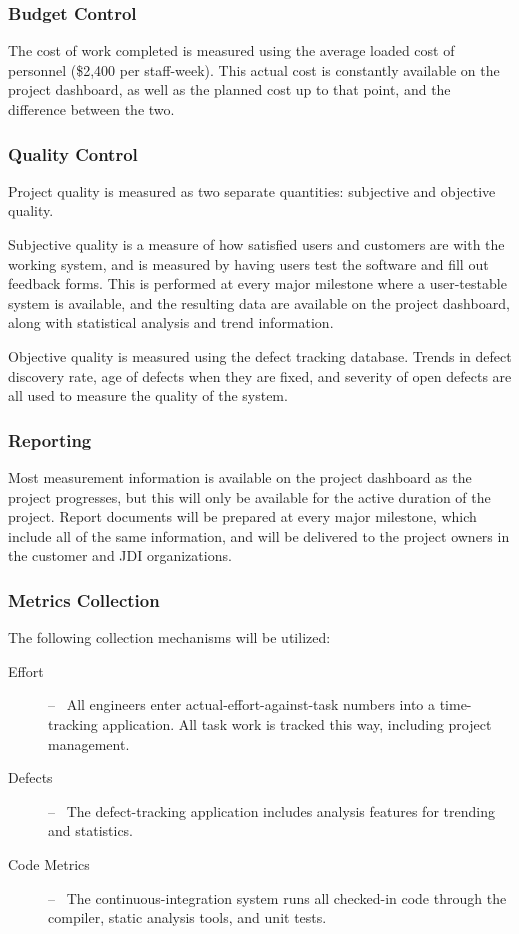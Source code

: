 \documentclass[11pt]{article}
\newcommand{\loadedcost}{\$2,400 per staff-week}
\begin{document}
\subsubsection{Budget Control}
The cost of work completed is measured using the average loaded cost of personnel (\loadedcost).
This actual cost is constantly available on the project dashboard, as well as the planned cost up to
that point, and the difference between the two.  


\subsubsection{Quality Control}
Project quality is measured as two separate quantities: subjective and objective quality.

Subjective quality is a measure of how satisfied users and customers are with the working system,
and is measured by having users test the software and fill out feedback forms.  This is performed at
every major milestone where a user-testable system is available, and the resulting data are
available on the project dashboard, along with statistical analysis and trend information.

Objective quality is measured using the defect tracking database.  Trends in defect discovery rate,
age of defects when they are fixed, and severity of open defects are all used to measure the quality
of the system.
  
\subsubsection{Reporting}
Most measurement information is available on the project dashboard as the project progresses, but
this will only be available for the active duration of the project.  Report documents will be
prepared at every major milestone, which include all of the same information, and will be delivered
to the project owners in the customer and JDI organizations.

\subsubsection{Metrics Collection}
The following collection mechanisms will be utilized:
\begin{description}
\item[Effort] --~ All engineers enter actual-effort-against-task numbers into a time-tracking
  application.  All task work is tracked this way, including project management.
\item[Defects] --~ The defect-tracking application includes analysis features for trending and
  statistics.
\item[Code Metrics] --~ The continuous-integration system runs all checked-in code through the
  compiler, static analysis tools, and unit tests.
\end{description}
\end{document}
